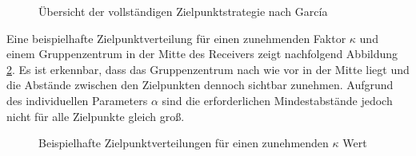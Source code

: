 \begin{figure}[h!]
    \centering
    \setlength{\fboxsep}{1pt}
    \setlength{\fboxrule}{1pt}
\caption[Übersicht der vollständigen Zielpunktstrategie nach García]{Übersicht der vollständigen Zielpunktstrategie nach García \cite[S. 10]{Garcia2}}
    \label{fig_GarciaAlg}
\end{figure}

Eine beispielhafte Zielpunktverteilung für einen zunehmenden Faktor $\kappa$ und einem Gruppenzentrum in der Mitte des Receivers zeigt nachfolgend Abbildung \ref{fig_GarciaZielpunkte}.
Es ist erkennbar, dass das Gruppenzentrum nach wie vor in der Mitte liegt und die Abstände zwischen den Zielpunkten dennoch sichtbar zunehmen.
Aufgrund des individuellen Parameters $\alpha$ sind die erforderlichen Mindestabstände jedoch nicht für alle Zielpunkte gleich groß.

\begin{figure}[h!]
    \centering
    \setlength{\fboxsep}{1pt}
    \setlength{\fboxrule}{1pt}
\caption[Beispielhafte Zielpunktverteilungen für einen zunehmenden $\kappa$ Wert]{Beispielhafte Zielpunktverteilungen für einen zunehmenden $\kappa$ Wert \cite[S. 11]{Garcia2}}
    \label{fig_GarciaZielpunkte}
\end{figure}

